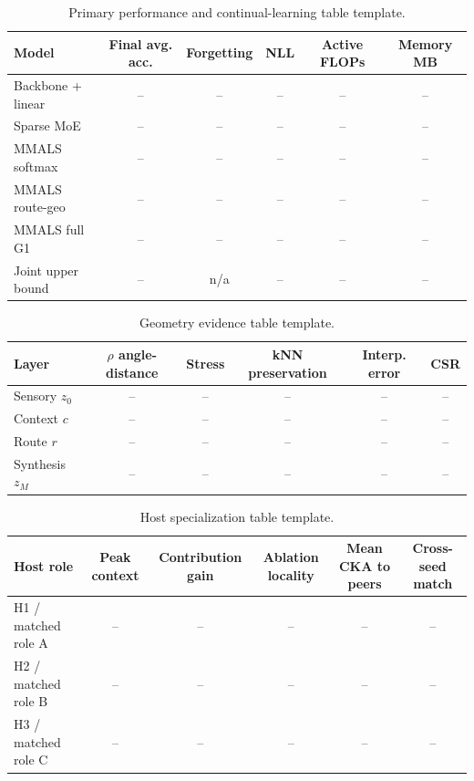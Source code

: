 \documentclass[11pt,a4paper]{article}
\begin{document}
\begin{table}[H]
\centering
\caption{Primary performance and continual-learning table template.}
\begin{tabularx}{\textwidth}{@{}Y C C C C C@{}}
\toprule
Model & Final avg. acc. & Forgetting & NLL & Active FLOPs & Memory MB \\
\midrule
Backbone + linear & -- & -- & -- & -- & -- \\
Sparse MoE & -- & -- & -- & -- & -- \\
MMALS softmax & -- & -- & -- & -- & -- \\
MMALS route-geo & -- & -- & -- & -- & -- \\
MMALS full G1 & -- & -- & -- & -- & -- \\
Joint upper bound & -- & n/a & -- & -- & -- \\
\bottomrule
\end{tabularx}
\end{table}

\begin{table}[H]
\centering
\caption{Geometry evidence table template.}
\begin{tabularx}{\textwidth}{@{}Y C C C C C@{}}
\toprule
Layer & \(\rho\) angle-distance & Stress & kNN preservation & Interp. error & CSR \\
\midrule
Sensory \(z_0\) & -- & -- & -- & -- & -- \\
Context \(c\) & -- & -- & -- & -- & -- \\
Route \(r\) & -- & -- & -- & -- & -- \\
Synthesis \(z_M\) & -- & -- & -- & -- & -- \\
\bottomrule
\end{tabularx}
\end{table}

\begin{table}[H]
\centering
\caption{Host specialization table template.}
\begin{tabularx}{\textwidth}{@{}Y C C C C C@{}}
\toprule
Host role & Peak context & Contribution gain & Ablation locality & Mean CKA to peers & Cross-seed match \\
\midrule
H1 / matched role A & -- & -- & -- & -- & -- \\
H2 / matched role B & -- & -- & -- & -- & -- \\
H3 / matched role C & -- & -- & -- & -- & -- \\
\bottomrule
\end{tabularx}
\end{table}
\end{document}

